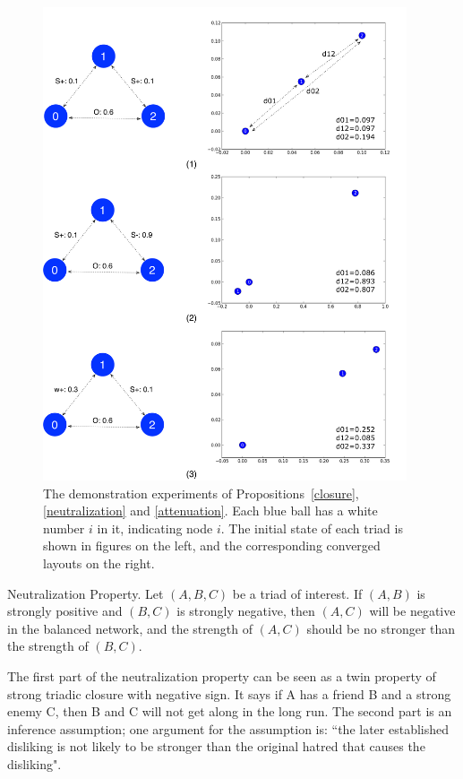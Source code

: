 \begin{figure}[th]
\centering
\includegraphics[height=5.5in]{Figs/demo1.pdf}
\caption{\label{demo1}The demonstration experiments of Propositions~\ref{closure}, \ref{neutralization} and \ref{attenuation}. Each blue ball has a white number $i$ in it, indicating node $i$. The initial state of each triad is shown in figures on the left, and the corresponding converged layouts on the right.}
\end{figure}
\begin{proposition}\label{neutralization}
Neutralization Property. Let $(A,B,C)$ be a triad of interest. If $(A,B)$ is strongly positive and $(B,C)$ is strongly negative, then $(A,C)$ will be negative in the balanced network, and the strength of $(A,C)$ should be no stronger than the strength of $(B,C)$.   
\end{proposition}
The first part of the neutralization property can be seen as a twin property of strong triadic closure with negative sign. It says if A has a friend B and a strong enemy C, then B and C will not get along in the long run. The second part is an inference assumption; one argument for the assumption is: ``the later established disliking is not likely to be stronger than the original hatred that causes the disliking". 

